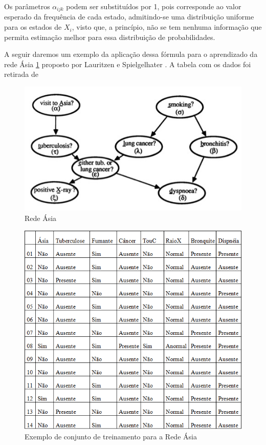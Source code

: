 Os parâmetros $\alpha_{ijk}$ podem ser substituídos por 1, pois corresponde ao valor esperado da frequência de cada estado, admitindo-se uma distribuição uniforme para os estados de $X_i$, visto que, a princípio, não se tem nenhuma informação que permita estimação melhor para essa distribuição de probabilidades.

A seguir daremos um exemplo da aplicação dessa fórmula para o aprendizado da rede Ásia \ref{fig:red_asia} proposto por Lauritzen e Spielgelhater \cite{lauritzen88}. A tabela com os dados foi retirada de \cite{custodio05}


\begin{figure}[ht]
	\centering
	\includegraphics{figuras/red_asia}
	\caption[Rede Ásia]{Rede Ásia}
	\label{fig:red_asia}
\end{figure}

\begin{figure}[ht]
	\centering
	\includegraphics{figuras/tabela_asia}
	\caption[Dados para Treinamento para a rede Ásia]{Exemplo de conjunto de treinamento para a Rede Ásia}
	\label{fig:tabela_asia}
\end{figure}

